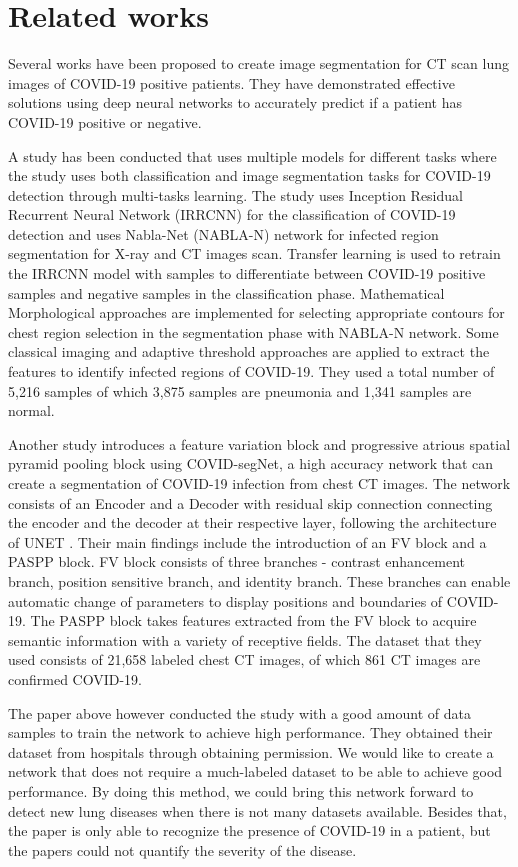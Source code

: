\section{Related works}

Several works have been proposed to create image segmentation for CT scan lung images of COVID-19 positive patients. They have demonstrated effective solutions using deep neural networks to accurately predict if a patient has COVID-19 positive or negative. 

A study has been conducted that uses multiple models for different tasks where the study uses both classification and image segmentation tasks for COVID-19 detection through multi-tasks learning. The study uses Inception Residual Recurrent Neural Network (IRRCNN) for the classification of COVID-19 detection and uses Nabla-Net (NABLA-N) network for infected region segmentation for X-ray and CT images scan. \cite{ref1} Transfer learning is used to retrain the IRRCNN model with samples to differentiate between COVID-19 positive samples and negative samples in the classification phase. Mathematical Morphological approaches are implemented for selecting appropriate contours for chest region selection in the segmentation phase with NABLA-N network. Some classical imaging and adaptive threshold approaches are applied to extract the features to identify infected regions of COVID-19. They used a total number of 5,216 samples of which 3,875 samples are pneumonia and 1,341 samples are normal.

Another study \cite{ref2} introduces a feature variation block and progressive atrious spatial pyramid pooling block using COVID-segNet, a high accuracy network that can create a segmentation of COVID-19 infection from chest CT images. The network consists of an Encoder and a Decoder with residual skip connection connecting the encoder and the decoder at their respective layer, following the architecture of UNET \cite{ref3}. Their main findings include the introduction of an FV block and a PASPP block. FV block consists of three branches - contrast enhancement branch, position sensitive branch, and identity branch. These branches can enable automatic change of parameters to display positions and boundaries of COVID-19. The PASPP block takes features extracted from the FV block to acquire semantic information with a variety of receptive fields. The dataset that they used consists of 21,658 labeled chest CT images, of which 861 CT images are confirmed COVID-19. 

The paper above however conducted the study with a good amount of data samples to train the network to achieve high performance. They obtained their dataset from hospitals through obtaining permission. We would like to create a network that does not require a much-labeled dataset to be able to achieve good performance. By doing this method, we could bring this network forward to detect new lung diseases when there is not many datasets available. Besides that, the paper is only able to recognize the presence of COVID-19 in a patient, but the papers could not quantify the severity of the disease. 

